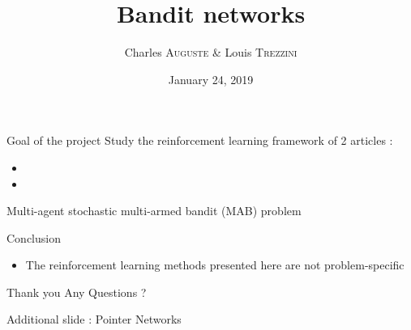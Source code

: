 \documentclass{beamer}
\title{Bandit networks}
\date{January 24, 2019}
\author{Charles \textsc{Auguste} \& Louis \textsc{Trezzini}}
\begin{document}
\maketitle

\begin{frame}{Goal of the project}
Study the reinforcement learning framework of 2 articles :
\begin{itemize}
\item {}
\item {}
\end{itemize}
\end{frame}

\begin{frame}{Multi-agent stochastic multi-armed bandit (MAB) problem}
\end{frame}

\begin{frame}{Conclusion}
\begin{itemize}
\item The reinforcement learning methods presented here are \alert{not problem-specific}\end{itemize}
\end{frame}


\begin{frame}{Thank you}
\centering \Huge Any Questions ?
\end{frame}

\begin{frame}
\AtNextBibliography{\tiny}
\printbibliography
\end{frame}

\begin{frame}{Additional slide : Pointer Networks}

\end{frame}
\end{document}
